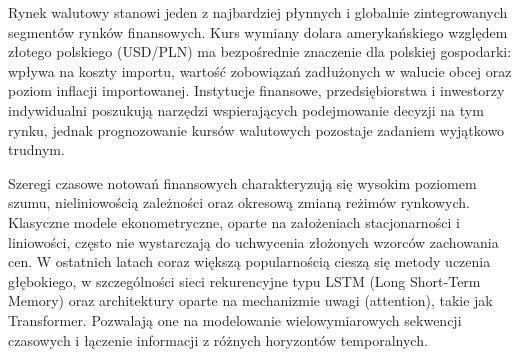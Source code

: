 %
%
%



Rynek walutowy stanowi jeden z najbardziej płynnych i globalnie zintegrowanych segmentów rynków finansowych.
Kurs wymiany dolara amerykańskiego względem złotego polskiego (USD/PLN) ma bezpośrednie znaczenie dla polskiej gospodarki:
wpływa na koszty importu, wartość zobowiązań zadłużonych w walucie obcej oraz poziom inflacji importowanej.
Instytucje finansowe, przedsiębiorstwa i inwestorzy indywidualni poszukują narzędzi wspierających podejmowanie decyzji na tym rynku,
jednak prognozowanie kursów walutowych pozostaje zadaniem wyjątkowo trudnym.

Szeregi czasowe notowań finansowych charakteryzują się wysokim poziomem szumu, nieliniowością zależności
oraz okresową zmianą reżimów rynkowych. Klasyczne modele ekonometryczne, oparte na założeniach stacjonarności
i liniowości, często nie wystarczają do uchwycenia złożonych wzorców zachowania cen.
W ostatnich latach coraz większą popularnością cieszą się metody uczenia głębokiego, w szczególności sieci rekurencyjne
typu LSTM (Long Short-Term Memory) oraz architektury oparte na mechanizmie uwagi (attention), takie jak Transformer.
Pozwalają one na modelowanie wielowymiarowych sekwencji czasowych i łączenie informacji z różnych horyzontów temporalnych.

